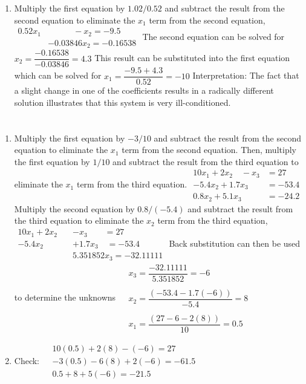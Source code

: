 \documentclass[../main.tex]{subfiles}
\begin{document}
\begin{enumerate}[label=\bfseries(\alph*)]
\item Multiply the first equation by $1.02 / 0.52$ and subtract the result from the second equation to eliminate the $x_{1}$ term from the second equation,
\bigbreak
$
\begin{aligned}
0.52 x_{1}&\quad\quad\quad-x_{2}=-9.5 \\&
-0.03846 x_{2}=-0.16538
\end{aligned}$
\bigbreak
The second equation can be solved for
\bigbreak
$x_{2}=\dfrac{-0.16538}{-0.03846}=4.3$
\bigbreak
This result can be substituted into the first equation which can be solved for
\bigbreak
$x_{1}=\dfrac{-9.5+4.3}{0.52}=-10$
\bigbreak
Interpretation: The fact that a slight change in one of the coefficients results in a radically different solution illustrates that this system is very ill-conditioned.
\bigbreak
\end{enumerate}

\section{}
\begin{enumerate}[label=\bfseries(\alph*)]
\item Multiply the first equation by $-3 / 10$ and subtract the result from the second equation to eliminate the $x_{1}$ term from the second equation. Then, multiply the first equation by $1 / 10$ and subtract the result from the third equation to eliminate the $x_{1}$ term from the third equation.
\bigbreak$
\begin{aligned}
10 x_{1}+2 x_{2} \quad-x_{3} &=27 \\
-5.4 x_{2}+1.7 x_{3} &=-53.4 \\
0.8 x_{2}+5.1 x_{3} &=-24.2
\end{aligned}$
\bigbreak
Multiply the second equation by $0.8 /(-5.4)$ and subtract the result from the third equation to eliminate the $x_{2}$ term from the third equation,
\bigbreak$
\begin{aligned}
10 x_{1}+2 x_{2} \quad&-x_{3}\quad\quad=27 \\
-5.4 x_{2} \quad&+1.7 x_{3}\quad=-53.4 \\
&5.351852 x_{3}=-32.11111 
\end{aligned}$
\bigbreak
Back substitution can then be used to determine the unknowns
\bigbreak$
\begin{aligned}
&x_{3}=\dfrac{-32.11111}{5.351852}=-6 \\\\
&x_{2}=\dfrac{(-53.4-1.7(-6))}{-5.4}=8 \\\\
&x_{1}=\dfrac{(27-6-2(8))}{10}=0.5
\end{aligned}$
\bigbreak
\item Check:
\bigbreak$
\begin{aligned}
&10(0.5)+2(8)-(-6)=27 \\
&-3(0.5)-6(8)+2(-6)=-61.5 \\
&0.5+8+5(-6)=-21.5
\end{aligned}$
\bigbreak
\end{enumerate}
\end{document}
